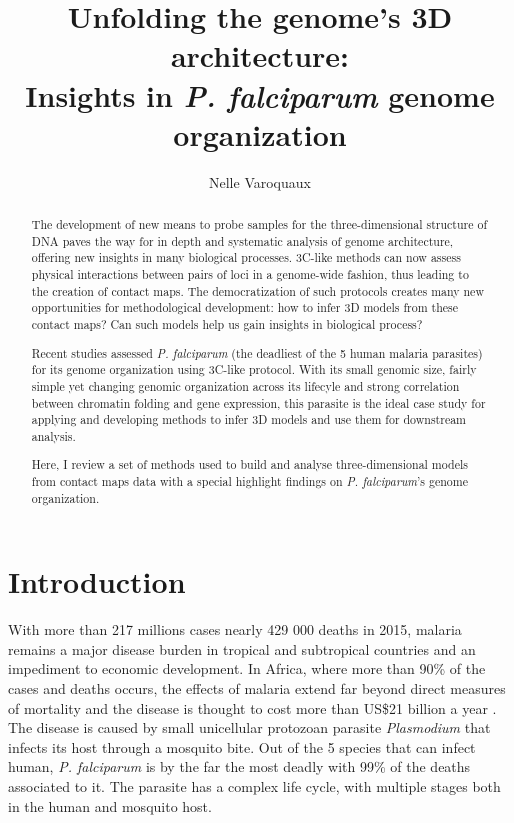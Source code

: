 \documentclass[2columns]{article}
\begin{document}
\title{Unfolding the genome's 3D architecture:\\
  \Large{Insights in {\em P. falciparum} genome organization}}
\author{Nelle Varoquaux}

\maketitle


\begin{abstract}
The development of new means to probe samples for the three-dimensional
structure of DNA paves the way for in depth and systematic analysis of genome
architecture, offering new insights in many biological processes. 3C-like
methods can now assess physical interactions between pairs of loci in a
genome-wide fashion, thus leading to the creation of contact maps. The
democratization of such protocols creates many new opportunities for
methodological development: how to infer 3D models from these contact maps?
Can such models help us gain insights in biological process?

Recent studies assessed {\em P. falciparum} (the deadliest of the 5
human malaria parasites) for its genome organization using 3C-like protocol.
With its small genomic size, fairly simple yet changing genomic organization
across its lifecyle and strong correlation between chromatin folding and gene
expression, this parasite is the ideal case study for applying and developing
methods to infer 3D models and use them for downstream analysis. 

Here, I review a set of methods used to build and analyse three-dimensional
models from contact maps data with a special highlight findings on {\em P.
falciparum}'s genome organization.
\end{abstract}


\section{Introduction}
\label{sec:introduction}

With more than 217 millions cases nearly 429 000 deaths in 2015,  malaria
remains a major disease burden in tropical and subtropical countries and an
impediment to economic development. In Africa, where more than 90\% of the
cases and deaths occurs, the effects of malaria extend far beyond direct
measures of mortality and the disease is thought to cost more than US\$21
billion a year \citep{onwujekwe:do}. The disease is caused by small
unicellular protozoan parasite {\em Plasmodium} that infects its host through
a mosquito bite. Out of the 5 species that can infect human, {\em P.
falciparum} is by the far the most deadly with 99\% of the deaths associated
to it. The parasite has a complex life cycle, with multiple stages both in the
human and mosquito host.
\end{document}
